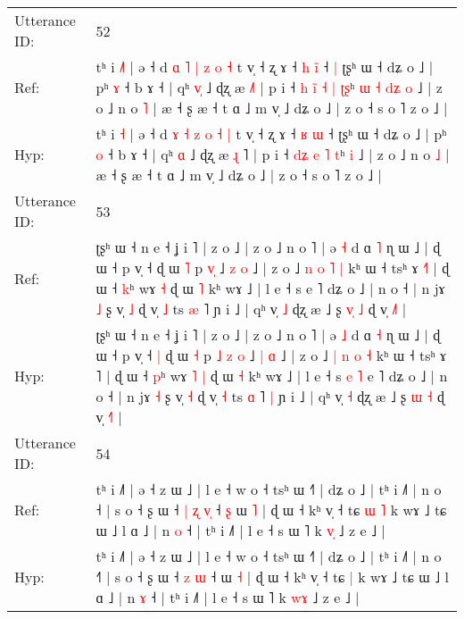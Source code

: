 \documentclass[10pt]{article}
\DeclareRobustCommand{\hl}[1]{{\textcolor{red}{#1}}}
\begin{document}
\begin{longtable}{ll}
 \\
\midrule
Utterance ID: & 52 \\
Ref: & tʰ i \hl{˩}\hl{˥} | ə ˧ d \hl{ɑ} \hl{˥} \hl{|} \hl{z} \hl{o} \hl{˧} t v̩ ˧ ʐ ɤ ˧ \hl{h} \hl{i}\hl{̃} ˧\hl{ }\hl{|} ʈʂʰ ɯ ˧ dʑ o ˩ | pʰ \hl{ɤ} ˧ b ɤ ˧ | qʰ \hl{v}\hl{̩} ˩ ɖʐ æ \hl{}\hl{˩}˥ | p i ˧\hl{ }\hl{h} \hl{i}\hl{̃} \hl{˧} \hl{|} \hl{ʈ}\hl{ʂ}ʰ\hl{ }\hl{ɯ}\hl{ }\hl{˧}\hl{ }\hl{d}\hl{ʑ} \hl{o} ˩ | z o ˩ n o \hl{˥} | æ ˧ ʂ æ ˧ t ɑ ˩ m v̩ ˩ dʑ o ˩ | z o ˧ s o ˥ z o ˩ |
 \\
Hyp: & tʰ i \hl{}\hl{˧} | ə ˧ d \hl{ɤ} \hl{˧} \hl{z} \hl{o} \hl{˧} \hl{|} t v̩ ˧ ʐ ɤ ˧ \hl{ʁ} \hl{}\hl{ɯ} ˧\hl{}\hl{} ʈʂʰ ɯ ˧ dʑ o ˩ | pʰ \hl{o} ˧ b ɤ ˧ | qʰ \hl{}\hl{ɑ} ˩ ɖʐ æ \hl{ɻ}\hl{ }˥ | p i ˧\hl{}\hl{} \hl{d}\hl{ʑ} \hl{e} \hl{˥} \hl{}\hl{t}ʰ\hl{}\hl{}\hl{}\hl{}\hl{}\hl{}\hl{} \hl{i} ˩ | z o ˩ n o \hl{˩} | æ ˧ ʂ æ ˧ t ɑ ˩ m v̩ ˩ dʑ o ˩ | z o ˧ s o ˥ z o ˩ |
 \\
\midrule
Utterance ID: & 53 \\
Ref: & ʈʂʰ ɯ ˧ n e ˧ ʝ i ˥ | z o ˩ | z o ˩ n o ˥ | ə \hl{˧} d ɑ \hl{˥} ɳ ɯ ˩ | ɖ ɯ ˧ p v̩ ˧\hl{}\hl{} ɖ ɯ \hl{˥} p\hl{}\hl{} \hl{}\hl{v}\hl{̩} ˩ \hl{z} \hl{o} ˩ | z o ˩ \hl{n} \hl{o} \hl{˥} \hl{|} kʰ ɯ ˧ tsʰ ɤ \hl{˧}˥ | ɖ ɯ ˧ \hl{k}ʰ wɤ\hl{}\hl{} \hl{˧} ɖ ɯ \hl{˥} kʰ wɤ ˩ | l e ˧ s\hl{}\hl{}\hl{}\hl{} e ˥ dʑ o ˩ | n o ˧ | n jɤ \hl{˩} ʂ v̩ \hl{˩} ɖ v̩ \hl{˩} ts \hl{æ} ˥\hl{}\hl{} ɲ i ˩ | qʰ v̩ \hl{˩} ɖʐ æ ˩ ʂ \hl{v}\hl{̩} \hl{˩} ɖ v̩ \hl{˩}˥ |
 \\
Hyp: & ʈʂʰ ɯ ˧ n e ˧ ʝ i ˥ | z o ˩ | z o ˩ n o ˥ | ə \hl{˩} d ɑ \hl{˧} ɳ ɯ ˩ | ɖ ɯ ˧ p v̩ ˧\hl{ }\hl{|} ɖ ɯ \hl{˧} p\hl{ }\hl{˩} \hl{z}\hl{ }\hl{o} ˩ \hl{|} \hl{ɑ} ˩ | z o ˩ \hl{|} \hl{n} \hl{o} \hl{˧} kʰ ɯ ˧ tsʰ ɤ \hl{}˥ | ɖ ɯ ˧ \hl{p}ʰ wɤ\hl{ }\hl{˥} \hl{|} ɖ ɯ \hl{˧} kʰ wɤ ˩ | l e ˧ s\hl{ }\hl{e}\hl{ }\hl{˥} e ˥ dʑ o ˩ | n o ˧ | n jɤ \hl{˧} ʂ v̩ \hl{˧} ɖ v̩ \hl{˧} ts \hl{ɑ} ˥\hl{ }\hl{|} ɲ i ˩ | qʰ v̩ \hl{˧} ɖʐ æ ˩ ʂ \hl{}\hl{ɯ} \hl{˧} ɖ v̩ \hl{˧}˥ |
 \\
\midrule
Utterance ID: & 54 \\
Ref: & tʰ i ˩˥ | ə ˧ z ɯ ˩ | l e ˧ w o ˧ tsʰ ɯ ˧˥ | dʑ o ˩ | tʰ i ˩˥ | n o ˧\hl{} | s o ˧ ʂ ɯ ˧\hl{ }\hl{|} \hl{ʐ} \hl{v}\hl{̩} ˧\hl{ }\hl{ʂ} ɯ \hl{˥} | ɖ ɯ ˧ kʰ v̩ ˧ tɕ\hl{ }\hl{ɯ} \hl{˥} k wɤ ˩ tɕ ɯ ˩ l ɑ ˩ | n \hl{o} ˧ | tʰ i ˩˥ | l e ˧ s ɯ ˥ k \hl{v}\hl{̩} ˩ z e ˩ |
 \\
Hyp: & tʰ i ˩˥ | ə ˧ z ɯ ˩ | l e ˧ w o ˧ tsʰ ɯ ˧˥ | dʑ o ˩ | tʰ i ˩˥ | n o ˧\hl{˥} | s o ˧ ʂ ɯ ˧\hl{}\hl{} \hl{z} \hl{}\hl{ɯ} ˧\hl{}\hl{} ɯ \hl{˧} | ɖ ɯ ˧ kʰ v̩ ˧ tɕ\hl{}\hl{} \hl{|} k wɤ ˩ tɕ ɯ ˩ l ɑ ˩ | n \hl{ɤ} ˧ | tʰ i ˩˥ | l e ˧ s ɯ ˥ k \hl{w}\hl{ɤ} ˩ z e ˩ |

\end{longtable}
\end{document}
